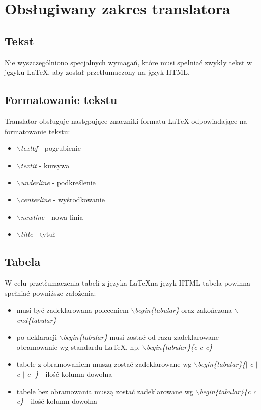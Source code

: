 \chapter{Obsługiwany zakres translatora}

\section{Tekst}
Nie wyszczególniono specjalnych wymagań, które musi spełniać zwykły tekst w języku \LaTeX \space, 
aby został przetłumaczony na język HTML.

\section{Formatowanie tekstu}

Translator obsługuje następujące znaczniki formatu LaTeX odpowiadające na formatowanie tekstu:
\begin{itemize}
    \item \textit{$\backslash$textbf} - pogrubienie
    \item \textit{$\backslash$textit} - kursywa
    \item \textit{$\backslash$underline} - podkreślenie
    \item \textit{$\backslash$centerline} - wyśrodkowanie
    \item \textit{$\backslash$newline} - nowa linia
    \item \textit{$\backslash$title} - tytuł
\end{itemize}

\section{Tabela}
W celu przetłumaczenia tabeli z języka \LaTeX \space na język HTML tabela powinna spełniać powniższe założenia: 
\begin{itemize}
    \item musi być zadeklarowana poleceniem \textit{$\backslash$begin\{tabular\}} oraz zakończona \textit{$\backslash$end\{tabular\}}
    \item po deklaracji \textit{$\backslash$begin\{tabular\}} musi zostać od razu zadeklarowane obramowanie wg standardu \LaTeX \space,
    np. \textit{$\backslash$begin\{tabular\}\{c c c\}}
    \item tabele z obramowaniem muszą zostać zadeklarowane wg \textit{$\backslash$begin\{tabular\}\{$|$ c $|$ c $|$ c $|$\}} - ilość kolumn dowolna
    \item tabele bez obramowania muszą zostać zadeklarowane wg \textit{$\backslash$begin\{tabular\}\{c c c\}}  - ilość kolumn dowolna
\end{itemize}


